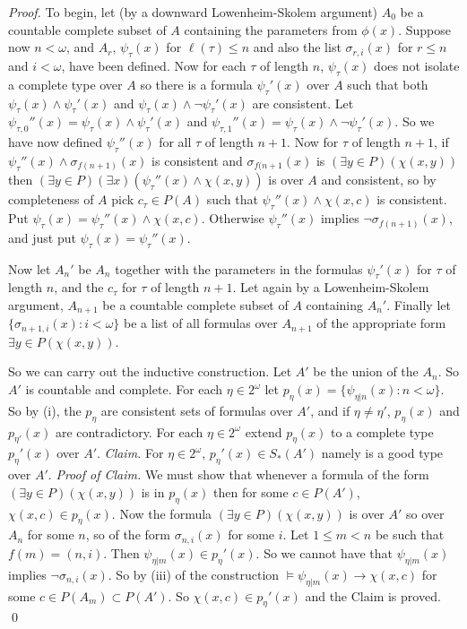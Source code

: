 \documentclass[10pt,a4paper]{amsart}
\begin{document}
\begin{proof}
\vspace{2mm}
\noindent
To begin, let (by a downward Lowenheim-Skolem argument) $A_{0}$ be a countable complete subset of $A$ containing the parameters from $\phi(x)$. 
Suppose now $n< \omega$,  and $A_{r}$, $\psi_{\tau}(x)$ for $\ell(\tau) \leq n$ and also the list $\sigma_{r,i}(x)$ for $r\leq n$ and $i<\omega$, have been defined. 
Now for each $\tau$ of length $n$, $\psi_{\tau}(x)$ does not isolate a complete type over $A$ so there is a formula $\psi_{\tau}'(x)$ over $A$ such that both $\psi_{\tau}(x)\wedge \psi_{\tau}'(x)$ and $\psi_{\tau}(x)\wedge \neg\psi_{\tau}'(x)$ are consistent.   Let $\psi_{\tau ,0}''(x)  = \psi_{\tau}(x)\wedge \psi_{\tau}'(x)$ and $\psi_{\tau, 1}''(x) = \psi_{\tau}(x)\wedge \neg\psi_{\tau}'(x)$. 
So we have now defined $\psi_{\tau}''(x)$ for all $\tau$ of length $n+1$.  Now for $\tau$ of length $n+1$, if $\psi_{\tau}''(x)\wedge \sigma_{f(n+1)}(x)$ is consistent and $\sigma_{f(n+1}(x)$ is $(\exists y\in P)(\chi(x,y))$ then 
$(\exists y\in P)(\exists x)(\psi_{\tau}''(x) \wedge \chi(x,y))$ is over $A$ and consistent, so by completeness of $A$ pick $c_{\tau} \in P(A)$ such that $\psi_{\tau}''(x)\wedge \chi(x,c)$ is consistent.  Put $\psi_{\tau}(x) = \psi_{\tau}''(x)\wedge \chi(x,c)$.  Otherwise $\psi_{\tau}''(x)$ implies $\neg\sigma_{f(n+1)}(x)$, and just put $\psi_{\tau}(x) = \psi_{\tau}''(x)$. 

Now let $A_{n}'$ be $A_{n}$ together with the parameters in the formulas $\psi_{\tau}'(x)$ for $\tau$ of length $n$, and the $c_{\tau}$ for $\tau$ of length $n+1$. Let again by a  Lowenheim-Skolem argument, $A_{n+1}$ be a countable complete subset of $A$ containing $A_{n}'$.  Finally let  $\{\sigma_{n+1, i}(x): i<\omega\}$ be a list of all formulas over $A_{n+1}$ of the appropriate form $\exists y\in P(\chi(x,y))$.

\vspace{2mm}
\noindent
So we can carry out the inductive construction. Let $A'$ be the union of the $A_{n}$. So $A'$ is countable and complete. For each  $\eta\in 2^{\omega}$ let $p_{\eta}(x) = \{\psi_{\eta|n}(x): n <\omega\}$. So by (i), the $p_{\eta}$ are consistent sets of formulas over $A'$, and if $\eta \neq \eta'$, $p_{\eta}(x)$ and $p_{\eta'}(x)$ are contradictory.
 For each $\eta\in 2^{\omega}$ extend $p_{\eta}(x)$ to a complete type $p_{\eta}'(x)$ over $A'$.
\newline
{\em Claim.}  For $\eta\in 2^{\omega}$, $p_{\eta}'(x) \in S_{*}(A')$ namely is a good type over $A'$. 
\newline
{\em Proof of Claim.}  We must show that whenever a formula of the form $(\exists y\in P)(\chi(x,y))$ is in $p_{\eta}(x)$ then for some $c\in P(A')$, $\chi(x,c)\in p_{\eta}(x)$.  Now the formula $(\exists y\in P)(\chi(x,y))$ is over $A'$ so 
over $A_{n}$ for some $n$, so of the form $\sigma_{n,i}(x)$ for some $i$. Let $1\leq m < n$ be such that $f(m) = (n,i)$. Then $\psi_{\eta|m}(x) \in p_{\eta}'(x)$. So we cannot have that $\psi_{\eta|m}(x)$ implies $\neg\sigma_{n,i}(x)$.  So by (iii) 
of the construction $\models \psi_{\eta|m}(x) \to \chi(x,c)$ for some $c\in P(A_{m})\subset P(A')$. So $\chi(x,c) \in p_{\eta}'(x)$ and the Claim is proved.  \qed


\end{proof}
\end{document}
